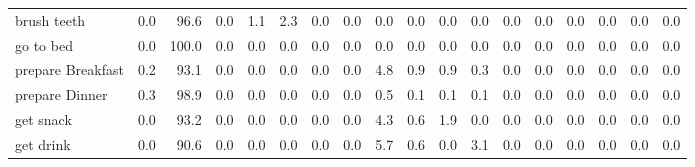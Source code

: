 \documentclass{article}
\begin{document}
\begin{sideways}
\begin{tabular}{lrrrrrrrrrrrrrrrrr}
brush teeth                   &         0.0 &               96.6 &           0.0 &               1.1 &                2.3 &                0.0 &              0.0 &                      0.0 &                   0.0 &              0.0 &              0.0 &                            0.0 &                      0.0 &                    0.0 &                                  0.0 &                          0.0 &                  0.0 \\
go to bed                     &         0.0 &              100.0 &           0.0 &               0.0 &                0.0 &                0.0 &              0.0 &                      0.0 &                   0.0 &              0.0 &              0.0 &                            0.0 &                      0.0 &                    0.0 &                                  0.0 &                          0.0 &                  0.0 \\
prepare Breakfast             &         0.2 &               93.1 &           0.0 &               0.0 &                0.0 &                0.0 &              0.0 &                      4.8 &                   0.9 &              0.9 &              0.3 &                            0.0 &                      0.0 &                    0.0 &                                  0.0 &                          0.0 &                  0.0 \\
prepare Dinner                &         0.3 &               98.9 &           0.0 &               0.0 &                0.0 &                0.0 &              0.0 &                      0.5 &                   0.1 &              0.1 &              0.1 &                            0.0 &                      0.0 &                    0.0 &                                  0.0 &                          0.0 &                  0.0 \\
get snack                     &         0.0 &               93.2 &           0.0 &               0.0 &                0.0 &                0.0 &              0.0 &                      4.3 &                   0.6 &              1.9 &              0.0 &                            0.0 &                      0.0 &                    0.0 &                                  0.0 &                          0.0 &                  0.0 \\
get drink                     &         0.0 &               90.6 &           0.0 &               0.0 &                0.0 &                0.0 &              0.0 &                      5.7 &                   0.6 &              0.0 &              3.1 &                            0.0 &                      0.0 &                    0.0 &                                  0.0 &                          0.0 &                  0.0 \\

\end{tabular}
\end{sideways}
\end{document}

